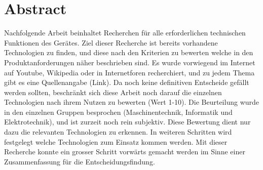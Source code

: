 \section{Abstract}
Nachfolgende Arbeit beinhaltet Recherchen für alle erforderlichen technischen Funktionen des Gerätes. Ziel dieser Recherche ist bereits vorhandene Technologien zu finden, und diese nach den Kriterien zu bewerten welche in den Produktanforderungen näher beschrieben sind. Es wurde vorwiegend im Internet auf Youtube, Wikipedia oder in Internetforen recherchiert, und zu jedem Thema gibt es eine Quellenangabe (Link). Da noch keine definitiven Entscheide gefällt werden sollten, beschränkt sich diese Arbeit noch darauf die einzelnen Technologien nach ihrem Nutzen zu bewerten (Wert 1-10). Die Beurteilung wurde in den einzelnen Gruppen besprochen (Maschinentechnik, Informatik und Elektrotechnik), und ist zurzeit noch rein subjektiv. Diese Bewertung dient nur dazu die relevanten Technologien zu erkennen. In weiteren Schritten wird festgelegt welche Technologien zum Einsatz kommen werden. Mit dieser Recherche konnte ein grosser Schritt vorwärts gemacht werden im Sinne einer Zusammenfassung für die Entscheidungsfindung.